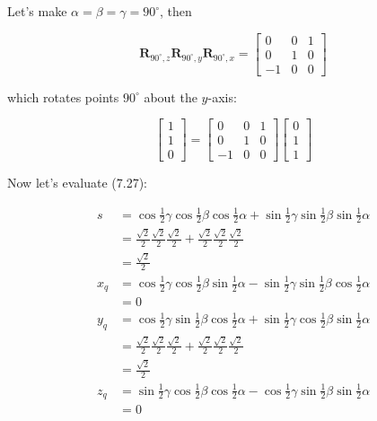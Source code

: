 Let's make $\alpha=\beta=\gamma=90^{\circ}$, then

$$
\mathbf{R}_{90^{\circ}, z} \mathbf{R}_{90^{\circ}, y} \mathbf{R}_{90^{\circ}, x}=\left[\begin{array}{ccc}
0 & 0 & 1 \\
0 & 1 & 0 \\
-1 & 0 & 0
\end{array}\right]
$$

which rotates points $90^{\circ}$ about the $y$-axis:

$$
\left[\begin{array}{l}
1 \\
1 \\
0
\end{array}\right]=\left[\begin{array}{ccc}
0 & 0 & 1 \\
0 & 1 & 0 \\
-1 & 0 & 0
\end{array}\right]\left[\begin{array}{l}
0 \\
1 \\
1
\end{array}\right]
$$

Now let's evaluate (7.27):

$$
\begin{aligned}
s & =\cos \frac{1}{2} \gamma \cos \frac{1}{2} \beta \cos \frac{1}{2} \alpha+\sin \frac{1}{2} \gamma \sin \frac{1}{2} \beta \sin \frac{1}{2} \alpha \\
& =\frac{\sqrt{2}}{2} \frac{\sqrt{2}}{2} \frac{\sqrt{2}}{2}+\frac{\sqrt{2}}{2} \frac{\sqrt{2}}{2} \frac{\sqrt{2}}{2} \\
& =\frac{\sqrt{2}}{2} \\
x_{q} & =\cos \frac{1}{2} \gamma \cos \frac{1}{2} \beta \sin \frac{1}{2} \alpha-\sin \frac{1}{2} \gamma \sin \frac{1}{2} \beta \cos \frac{1}{2} \alpha \\
& =0 \\
y_{q} & =\cos \frac{1}{2} \gamma \sin \frac{1}{2} \beta \cos \frac{1}{2} \alpha+\sin \frac{1}{2} \gamma \cos \frac{1}{2} \beta \sin \frac{1}{2} \alpha \\
& =\frac{\sqrt{2}}{2} \frac{\sqrt{2}}{2} \frac{\sqrt{2}}{2}+\frac{\sqrt{2}}{2} \frac{\sqrt{2}}{2} \frac{\sqrt{2}}{2} \\
& =\frac{\sqrt{2}}{2} \\
z_{q} & =\sin \frac{1}{2} \gamma \cos \frac{1}{2} \beta \cos \frac{1}{2} \alpha-\cos \frac{1}{2} \gamma \sin \frac{1}{2} \beta \sin \frac{1}{2} \alpha \\
& =0
\end{aligned}
$$

